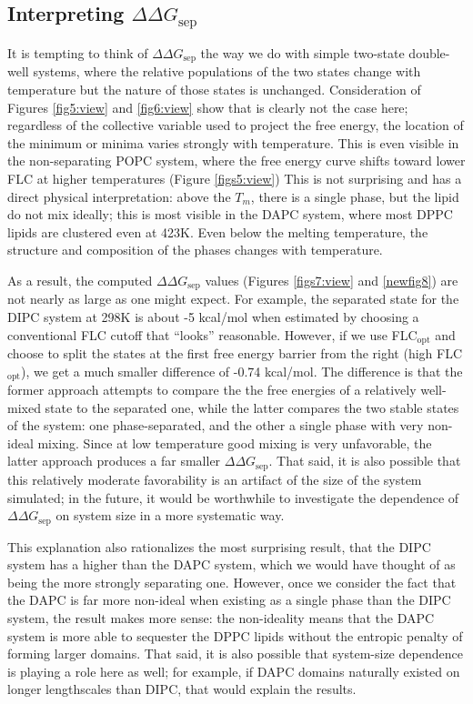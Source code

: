 \documentclass{biophys-new}
\begin{document}
\subsection*{Interpreting $\Delta \Delta G_{\text{sep}}$}

It is tempting to think of $\Delta \Delta G_{\text{sep}}$ the way we do with simple two-state double-well systems, where the relative populations of the two states change with temperature but the nature of those states is unchanged. Consideration of Figures \ref{fig5:view} and \ref{fig6:view} show that is clearly not the case here; regardless of the collective variable used to project the free energy, the location of the minimum or minima varies strongly with temperature. This is even visible in the non-separating POPC system, where the free energy curve shifts toward lower FLC at higher temperatures (Figure \ref{figs5:view}) This is not surprising and has a direct physical interpretation: above the $T_m$, there is a single phase, but the lipid do not mix ideally; this is most visible in the DAPC system, where most DPPC lipids are clustered even at 423K. Even below the melting temperature, the structure and composition of the phases changes with temperature.

As a result, the computed $\Delta \Delta G_{\text{sep}}$ values (Figures \ref{figs7:view} and \ref{newfig8}) are not nearly as large as one might expect. For example, the separated state for the DIPC system at 298K is about -5 kcal/mol when estimated by choosing a conventional FLC cutoff that ``looks'' reasonable. However, if we use FLC$_{\text{opt}}$ and choose to split the states at the first free energy barrier from the right (high FLC$_{\text{opt}}$), we get a much smaller difference of -0.74 kcal/mol.  The difference is that the former approach attempts to compare the the free energies of a relatively well-mixed state to the separated one, while the latter compares the two stable states of the system: one phase-separated, and the other a single phase with very non-ideal mixing. Since at low temperature good mixing is very unfavorable, the latter approach produces a far smaller $\Delta \Delta G_{\text{sep}}$.  That said, it is also possible that this relatively moderate favorability is an artifact of the size of the system simulated; in the future, it would be worthwhile to investigate the dependence of $\Delta \Delta G_{\text{sep}}$ on system size in a more systematic way.

This explanation also rationalizes the most surprising result, that the DIPC system has a higher than the DAPC system, which we would have thought of as being the more strongly separating one. However, once we consider the fact that the DAPC is far more non-ideal when existing as a single phase than the DIPC system, the result makes more sense: the non-ideality means that the DAPC system is more able to sequester the DPPC lipids without the entropic penalty of forming larger domains. That said, it is also possible that system-size dependence is playing a role here as well; for example, if DAPC domains naturally existed on longer lengthscales than DIPC, that would explain the results.
\end{document}
